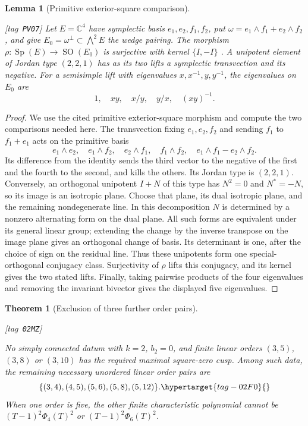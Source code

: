 \documentclass[11pt,a4paper]{article}
\numberwithin{equation}{section}
\newtheorem{theorem}{Theorem}[section]
\newtheorem{lemma}[lemma]{Lemma}
\theoremstyle{definition}
\newcommand{\StatementRecord}[4]{{\upshape\footnotesize[tag~\texttt{#3}]}\enspace\ignorespaces}
\begin{document}
\begin{lemma}[Primitive exterior-square comparison]
\hypertarget{tag-PV07}{}\label{pub:V:primitive-exterior-square}
\StatementRecord{pub:V:primitive-exterior-square}{proved}{PV07}{}
Let $E=\mathbb C^4$ have symplectic basis $e_1,e_2,f_1,f_2$,
put $\omega=e_1\wedge f_1+e_2\wedge f_2$, and give
$E_0=\omega^\perp\subset\bigwedge^2E$ the wedge pairing.
The morphism
$\rho:\operatorname{Sp}(E)\to\operatorname{SO}(E_0)$
is surjective with kernel $\{I,-I\}$
\cite[\S7.3, p.~129]{pubLieGroups2016}.
A unipotent element of Jordan type $(2,2,1)$ has as its two
lifts a symplectic transvection and its negative.
For a semisimple lift with eigenvalues $x,x^{-1},y,y^{-1}$,
the eigenvalues on $E_0$ are
\[
 1,\quad xy,\quad x/y,\quad y/x,\quad(xy)^{-1}.
\]
\end{lemma}
\begin{proof}
We use the cited primitive exterior-square morphism and compute
the two comparisons needed here.
The transvection fixing $e_1,e_2,f_2$ and sending $f_1$ to
$f_1+e_1$ acts on the primitive basis
\[
 e_1\wedge e_2,\quad e_1\wedge f_2,\quad e_2\wedge f_1,
 \quad f_1\wedge f_2,\quad e_1\wedge f_1-e_2\wedge f_2.
\]
Its difference from the identity sends the third vector to the
negative of the first and the fourth to the second, and kills
the others. Its Jordan type is $(2,2,1)$.
Conversely, an orthogonal unipotent $I+N$ of this type has
$N^2=0$ and $N^*=-N$, so its image is an isotropic plane.
Choose that plane, its dual isotropic plane, and the remaining
nondegenerate line. In this decomposition $N$ is determined by
a nonzero alternating form on the dual plane. All such forms
are equivalent under its general linear group; extending the
change by the inverse transpose on the image plane gives an
orthogonal change of basis. Its determinant is one, after the
choice of sign on the residual line. Thus these unipotents form
one special-orthogonal conjugacy class. Surjectivity of $\rho$
lifts this conjugacy, and its kernel gives the two stated lifts.
Finally, taking pairwise products of the four eigenvalues and
removing the invariant bivector gives the displayed five
eigenvalues.
\end{proof}

\begin{theorem}[Exclusion of three further order pairs]\hypertarget{tag-02MZ}{}\label{maps:src:F.2.10}
\StatementRecord{maps:src:F.2.10}{proved}{02MZ}{\cref{maps:src:F.2.9}, \eqref{maps:eq:F.31}, \cref{maps:src:F.2.8}, \cref{maps:src:F.3.1}}


No simply connected datum with $k=2$, $b_2=0$, and finite linear orders
$(3,5)$, $(3,8)$ or $(3,10)$ has the required maximal
square-zero cusp.  Among such data, the
remaining necessary unordered linear order pairs are
\begin{equation}
 \{(3,4),(4,5),(5,6),(5,8),(5,12)\}.
 \hypertarget{tag-02F0}{}\label{maps:eq:F.30}
\end{equation}
When one order is five, the other finite characteristic
polynomial cannot be $(T-1)^2\Phi_4(T)^2$ or
$(T-1)^2\Phi_6(T)^2$.

\end{theorem}
\end{document}
